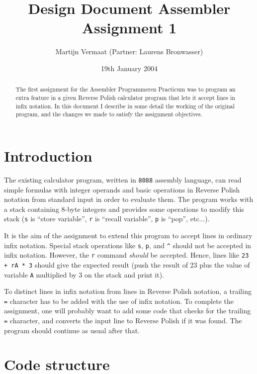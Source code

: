 \documentclass[11pt]{article}
\title{Design Document Assembler Assignment 1}
\author{
	Martijn Vermaat (Partner: Laurens Bronwasser)
}
\date{19th January 2004}
\begin{document}
\maketitle

\begin{abstract}
The first assignment for the Assembler Programmeren Practicum was to program an extra feature in a given Reverse Polish calculator program that lets it accept lines in infix notation. In this document I describe in some detail the working of the original program, and the changes we made to satisfy the assignment objectives.
\end{abstract}

\tableofcontents

\newpage

\section{Introduction}

The existing calculator program, written in \verb|8088| assembly language, can read simple formulas with integer operands and basic operations in Reverse Polish notation from standard input in order to evaluate them. The program works with a stack containing 8-byte integers and provides some operations to modify this stack (\verb|s| is ``store variable'', \verb|r| is ``recall variable'', \verb|p| is ``pop'', etc...).

It is the aim of the assignment to extend this program to accept lines in ordinary infix notation. Special stack operations like \verb|s|, \verb|p|, and \verb|^| should not be accepted in infix notation. However, the \verb|r| command \emph{should} be accepted. Hence, lines like \verb|23 + rA * 3| should give the expected result (push the result of 23 plus the value of variable \verb|A| multiplied by 3 on the stack and print it).

To distinct lines in infix notation from lines in Reverse Polish notation, a trailing \verb|=| character has to be added with the use of infix notation. To complete the assignment, one will probably want to add some code that checks for the trailing \verb|=| character, and converts the input line to Reverse Polish if it was found. The program should continue as usual after that.


\section{Code structure}
\end{document}
